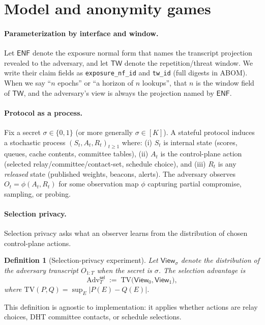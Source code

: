 \documentclass[11pt]{article}
\newtheorem{definition}{Definition}
\newcommand{\Adv}{\mathrm{Adv}}
\newcommand{\TV}{\mathrm{TV}}
\begin{document}
\section{Model and anonymity games}

\paragraph{Parameterization by interface and window.}
Let \(\mathsf{ENF}\) denote the exposure normal form that names the transcript projection revealed to the adversary, and let \(\mathsf{TW}\) denote the repetition/threat window.
We write their claim fields as \texttt{exposure\_nf\_id} and \texttt{tw\_id} (full digests in ABOM).
When we say ``\(n\) epochs'' or ``a horizon of \(n\) lookups'', that \(n\) is the window field of \(\mathsf{TW}\), and the adversary's view is always the projection named by \(\mathsf{ENF}\).

\label{sec:games}

\paragraph{Protocol as a process.}
Fix a secret $\sigma \in \{0,1\}$ (or more generally $\sigma\in[K]$).
A stateful protocol induces a stochastic process $(S_t,A_t,R_t)_{t\ge 1}$ where:
(i) $S_t$ is internal state (scores, queues, cache contents, committee tables),
(ii) $A_t$ is the control-plane action (selected relay/committee/contact-set, schedule choice), and
(iii) $R_t$ is any \emph{released} state (published weights, beacons, alerts).
The adversary observes $O_t = \phi(A_t,R_t)$ for some observation map $\phi$ capturing partial compromise, sampling, or probing.

\paragraph{Selection privacy.}
Selection privacy asks what an observer learns from the distribution of chosen control-plane actions.

\begin{definition}[Selection-privacy experiment]
Let $\mathsf{View}_\sigma$ denote the distribution of the adversary transcript $O_{1:T}$ when the secret is $\sigma$.
The selection advantage is
\[
\Adv^{\mathsf{sel}}_T \;:=\; \TV\big(\mathsf{View}_0,\mathsf{View}_1\big),
\]
where $\TV(P,Q)=\sup_E |P(E)-Q(E)|$.
\end{definition}

This definition is agnostic to implementation: it applies whether actions are relay choices, DHT committee contacts, or schedule selections.
\end{document}
